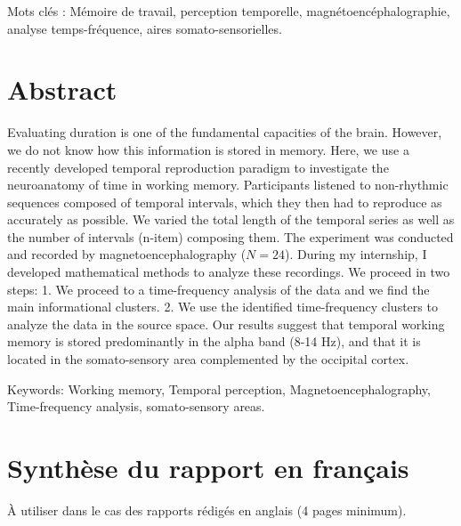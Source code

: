 Mots clés :
Mémoire de travail, perception temporelle, magnétoencéphalographie, analyse temps-fréquence, aires somato-sensorielles.
\chapter*{\centering Abstract}

Evaluating duration is one of the fundamental capacities of the brain. However, we do not know how this information is stored in memory. Here, we use a recently developed temporal reproduction paradigm to investigate the neuroanatomy of time in working memory. Participants listened to non-rhythmic sequences composed of temporal intervals, which they then had to reproduce as accurately as possible. We varied the total length of the temporal series as well as the number of intervals (n-item) composing them. The experiment was conducted and recorded by magnetoencephalography ($N=24$). During my internship, I developed mathematical methods to analyze these recordings. We proceed in two steps: 1. We proceed to a time-frequency analysis of the data and we find the main informational clusters. 2. We use the identified time-frequency clusters to analyze the data in the source space. Our results suggest that temporal working memory is stored predominantly in the alpha band (8-14 Hz), and that it is located in the somato-sensory area complemented by the occipital cortex.

Keywords:
Working memory, Temporal perception, Magnetoencephalography, Time-frequency analysis, somato-sensory areas.

\chapter*{\centering Synthèse du rapport en français}

À utiliser dans le cas des rapports rédigés en anglais (4 pages minimum).
